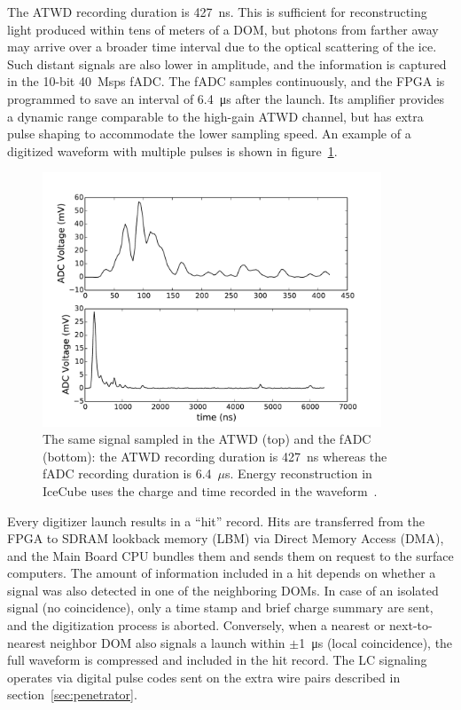 The ATWD recording duration is \qty{427}{ns}.  This is sufficient for
reconstructing light produced within tens of meters of
a DOM, but photons from farther away may arrive over a broader time
interval due to the optical scattering of the ice.  Such distant signals are
also lower in amplitude, and the information is captured in the 10-bit \qty{40}{Msps} fADC.
The fADC samples continuously, and the FPGA is programmed to save an
interval of \qty{6.4}{\micro\second} after the launch. Its amplifier provides a
dynamic range comparable to the high-gain ATWD channel, but has extra pulse shaping to accommodate the lower
sampling speed. An example of a digitized waveform with multiple pulses is shown in
figure~\ref{fig:mpe_waveform}.

\begin{figure}[h]
 \centering
 \includegraphics[width=0.9\textwidth]{graphics/dom/functional/mpe_waveform.pdf}
 \caption{The same signal sampled in the ATWD (top) and the fADC (bottom):
   the ATWD recording duration is 427~ns whereas the fADC recording
   duration is 6.4~$\mu$s. Energy reconstruction in IceCube uses
   the charge and time recorded in the waveform~\cite{IC3:ereco}.}
 \label{fig:mpe_waveform}
\end{figure}

Every digitizer launch results in a ``hit'' record.  Hits are
transferred from the FPGA to SDRAM lookback memory (LBM) via Direct Memory Access
(DMA), and the Main Board CPU bundles them and sends them on request to the surface
computers.   The amount of
information included in a hit depends on whether a signal was also detected in one of the neighboring DOMs.
In case of an isolated signal (no coincidence), only a time stamp and brief charge summary are sent, and
the digitization process is aborted.  Conversely, when a nearest or next-to-nearest neighbor DOM 
also signals a launch within $\pm$\qty{1}{\micro\second} (local coincidence), the full waveform is compressed
and included in the hit record.  The LC signaling operates via digital pulse codes sent on
the extra wire pairs described in section~\ref{sec:penetrator}.


